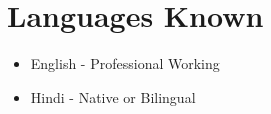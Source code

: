 \documentclass[9pt,a4paper]{extarticle}
\begin{document}
{\begin{minipage}[t]{\dimexpr0.34\textwidth-2\fboxsep\relax}
\section{Languages Known}
\begin{itemize}[leftmargin=12pt, itemsep=1pt, parsep=0pt]
    \item English - Professional Working
    \item Hindi - Native or Bilingual
\end{itemize}
\vspace*{1mm}
\end{minipage}%
}
\end{document}
